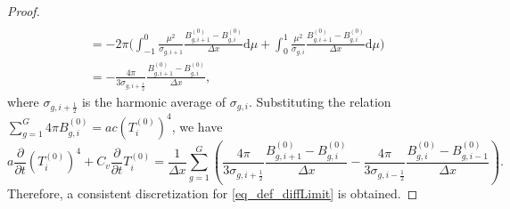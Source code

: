 \documentclass[preprint,12pt]{elsarticle}
\theoremstyle{definition}
\theoremstyle{plain}
\numberwithin{equation}{section}
\numberwithin{algorithm}{section}
\newcounter{eq_count}
\newcounter{subeq_count}
\newcommand{\dd}{{\text{d}}}
\newcommand{\pdrv}[2]{\frac{\partial{#1}}{\partial{#2}}}
\begin{document}
\begin{proof}
\begin{equation*}
\begin{aligned}
              \\
              & = - 2 \pi \Big( \int_{-1}^{0} \frac{ \mu^2}{\sigma_{g,i+1}}  \frac{B^{(0)}_{g,i + 1} - B^{(0)}_{g,i}}{\Delta x} \dd{\mu}  +  \int_{0}^{1} \frac{ \mu^2}{\sigma_{g,i }}  \frac{B^{(0)}_{g,i + 1} - B^{(0)}_{g,i}}{ \Delta x} \dd{\mu}  \Big)
              \\
              & = - \frac{4 \pi}{3 \sigma_{g,i+\frac{1}{2}}} \frac{B^{(0)}_{g,i + 1}- B^{(0)}_{g,i}}{\Delta x},
        \end{aligned}
    \end{equation*}
where $\sigma_{g,i+\frac{1}{2}}$ is the  harmonic average of  $\sigma_{g,i}$. Substituting the relation $\sum_{g=1}^G 4 \pi B_{g,i}^{(0)} = ac (T_{i}^{(0)} )^4$, we have 
    \begin{equation}
 	a \frac{\partial  }{\partial t} (T_{i}^{(0)} )^4 +C_v \frac{\partial }{\partial t} T_i^{(0)} = \frac{1}{\Delta x} \sum_{g=1}^G \left(\frac{4 \pi}{3 \sigma_{g,i+\frac{1}{2}}} \frac{B_{g,i + 1}^{(0)}- B_{g,i}^{(0)}}{\Delta x} - \frac{4 \pi}{3 \sigma_{g,i-\frac{1}{2}}} \frac{B_{g, i}^{(0)}- B_{g,i-1}^{(0)}}{\Delta x} \right).
 \end{equation}
    Therefore, a consistent discretization for \eqref{eq_def_diffLimit} is obtained.
\end{proof}

    

    

\end{document}
